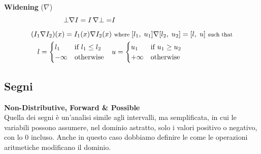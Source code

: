 \documentclass[a4paper,12pt,openany]{article}
\begin{document}
\textbf{Widening} ($\nabla$)
\begin{align*}
    \bot\nabla I = I\,\nabla\bot = &I\\[0.5em]
    (I_1 \nabla I_2)(x) = I_1(x)\nabla I_2(x) &\mbox{ \footnotesize where } [l_1,\;u_1]\nabla[l_2,\;u_2] = [l,\;u] \mbox{ \footnotesize such that}\\
    l =
    \begin{cases}
        l_1 & \mbox{if } l_1 \leq l_2\\
        -\infty & \mbox{otherwise}
    \end{cases}
    \quad &u =
    \begin{cases}
        u_1 & \mbox{if } u_1 \geq u_2\\
        +\infty & \mbox{otherwise}
    \end{cases}
\end{align*}

\clearpage
\subsection{Segni}
\textbf{Non-Distributive, Forward \& Possible}\\[1em]
Quella dei segni è un'analisi simile agli intervalli, ma semplificata, in cui le variabili possono assumere, nel dominio astratto, solo i valori positivo o negativo, con lo 0 incluso. Anche in questo caso dobbiamo definire le come le operazioni aritmetiche modificano il dominio.\\[1em]
\end{document}
